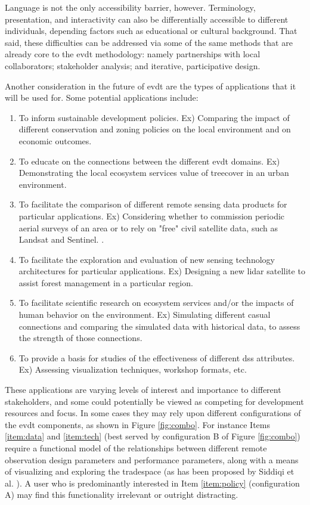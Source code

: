 Language is not the only accessibility barrier, however. Terminology, presentation, and interactivity can also be differentially accessible to different individuals, depending factors such as educational or cultural background. That said, these difficulties can be addressed via some of the same methods that are already core to the \ac{evdt} methodology: namely partnerships with local collaborators; stakeholder analysis; and iterative, participative design. 

Another consideration in the future of \ac{evdt} are the types of applications that it will be used for. Some potential applications include:

\begin{enumerate} \setlength{\itemsep}{0pt} \setlength{\parskip}{0pt}
    \item To inform sustainable development policies. Ex) Comparing the impact of different conservation and zoning policies on the local environment and on economic outcomes.  \label{item:policy}
    \item To educate on the connections between the different \ac{evdt} domains. Ex) Demonstrating the local ecosystem services value of treecover in an urban environment.
	\item To facilitate the comparison of different remote sensing data products for particular applications. Ex) Considering whether to commission periodic aerial surveys of an area or to rely on "free" civil satellite data, such as Landsat and Sentinel. \label{item:data}.
    \item To facilitate the exploration and evaluation of new sensing technology architectures for particular applications. Ex) Designing a new \ac{lidar} satellite to assist forest management in a particular region. \label{item:tech}
    \item To facilitate scientific research on ecosystem services and/or the impacts of human behavior on the environment. Ex) Simulating different casual connections and comparing the simulated data with historical data, to assess the strength of those connections.
    \item To provide a basis for studies of the effectiveness of different \ac{dss} attributes. Ex) Assessing visualization techniques, workshop formats, etc. \label{item:user}
\end{enumerate}

These applications are varying levels of interest and importance to different stakeholders, and some could potentially be viewed as competing for development resources and focus. In some cases they may rely upon different configurations of the \ac{evdt} components, as shown in Figure \ref{fig:combo}. For instance Items \ref{item:data} and \ref{item:tech} (best served by configuration B of Figure \ref{fig:combo}) require a functional model of the relationships between different remote observation design parameters and performance parameters, along with a means of visualizing and exploring the tradespace (as has been proposed by Siddiqi et al. \cite{siddiqiValuingNewEarth2019}). A user who is predominantly interested in Item \ref{item:policy} (configuration A) may find this functionality irrelevant or outright distracting.

